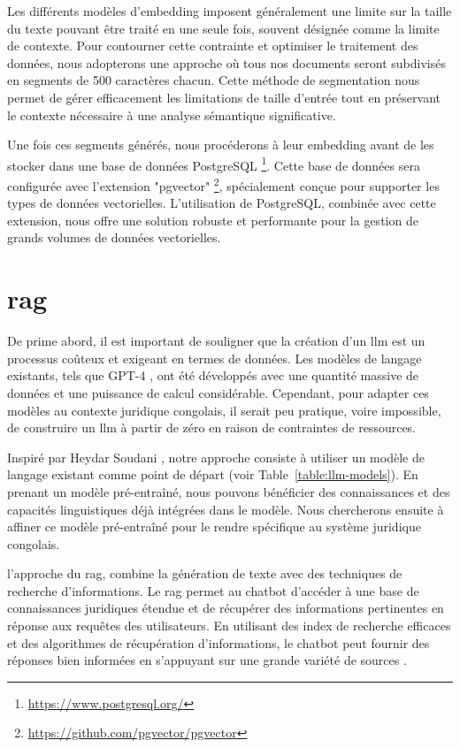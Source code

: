 Les différents modèles d'embedding imposent généralement une limite sur la taille du texte pouvant être traité en une seule fois, souvent désignée comme la limite de contexte. Pour contourner cette contrainte et optimiser le traitement des données, nous adopterons une approche où tous nos documents seront subdivisés en segments de 500 caractères chacun. Cette méthode de segmentation nous permet de gérer efficacement les limitations de taille d'entrée tout en préservant le contexte nécessaire à une analyse sémantique significative.

Une fois ces segments générés, nous procéderons à leur embedding avant de les stocker dans une base de données PostgreSQL \footnote{\href{https://www.postgresql.org/}{https://www.postgresql.org/}}. Cette base de données sera configurée avec l'extension "pgvector" \footnote{\href{https://github.com/pgvector/pgvector}{https://github.com/pgvector/pgvector}}, spécialement conçue pour supporter les types de données vectorielles. L'utilisation de PostgreSQL, combinée avec cette extension, nous offre une solution robuste et performante pour la gestion de grands volumes de données vectorielles.

\newpage
\section{\acf{rag}}

De prime abord, il est important de souligner que la création d'un \ac{llm} est un processus coûteux et exigeant en termes de données. Les modèles de langage existants, tels que GPT-4 \cite{openai2023gpt4}, ont été développés avec une quantité massive de données et une puissance de calcul considérable. Cependant, pour adapter ces modèles au contexte juridique congolais, il serait peu pratique, voire impossible, de construire un \ac{llm} à partir de zéro en raison de contraintes de ressources.

Inspiré par Heydar Soudani \cite{soudani2024fine}, notre approche consiste à utiliser un modèle de langage existant comme point de départ (voir Table~\ref{table:llm-models}). En prenant un modèle pré-entraîné, nous pouvons bénéficier des connaissances et des capacités linguistiques déjà intégrées dans le modèle. Nous chercherons ensuite à affiner ce modèle pré-entraîné pour le rendre spécifique au système juridique congolais. 

l'approche du \ac{rag}, combine la génération de texte avec des techniques de recherche d'informations. Le \ac{rag} permet au chatbot d'accéder à une base de connaissances juridiques étendue et de récupérer des informations pertinentes en réponse aux requêtes des utilisateurs. En utilisant des index de recherche efficaces et des algorithmes de récupération d'informations, le chatbot peut fournir des réponses bien informées en s'appuyant sur une grande variété de sources \cite{lewis2021retrievalaugmented}.

